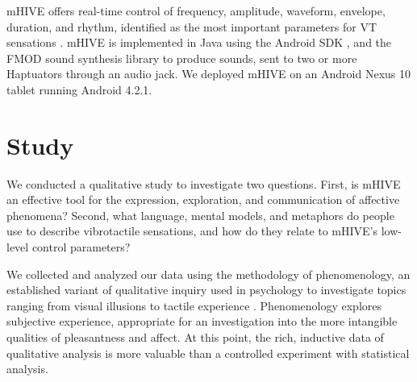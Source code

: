 mHIVE offers real-time control of frequency, amplitude, waveform, envelope, duration, and rhythm, identified as the most important parameters for VT sensations \cite{Gunther2002,Brown2006a,Brown2006,Brewster2004, Rovan2000}.
mHIVE is implemented in Java using the Android SDK \cite{AndroidOpenSourceProject2012}, and the FMOD sound synthesis library \cite{fmod2013} to produce sounds, sent to two or more Haptuators through an audio jack.
We deployed mHIVE on an Android Nexus 10 tablet running Android 4.2.1.




%
% 
\section{Study}

%
% 
We conducted a qualitative study to investigate two questions.
First, is mHIVE an effective tool for the expression, exploration, and communication of affective phenomena?
Second, what language, mental models, and metaphors do people use to describe vibrotactile sensations, and how do they relate to mHIVE's low-level control parameters?

We collected and analyzed our data using the methodology of phenomenology, 
an established variant of qualitative inquiry used in psychology to investigate topics ranging from visual illusions to tactile experience \cite{Richer1978, Obrist2013, Creswell2013}.
Phenomenology explores subjective experience, appropriate for an investigation into the more intangible qualities of pleasantness and affect.
At this point, the rich, inductive data of qualitative analysis is more valuable than a controlled experiment with statistical analysis.

